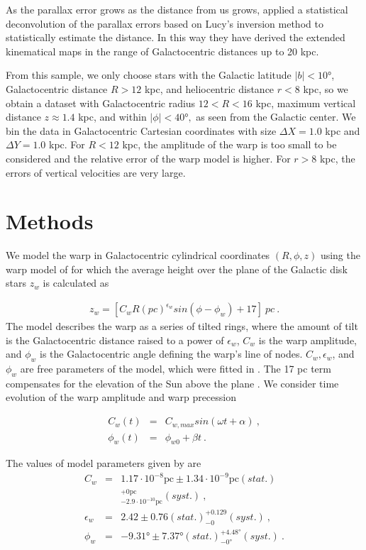 \documentclass[twocolumn]{aastex63}
\begin{document}
As the parallax error grows as the distance from us grows,  applied a statistical deconvolution of the parallax errors based on Lucy's inversion method \citep{lucy} to statistically estimate the distance. In this way they have derived the extended kinematical maps in the range of Galactocentric distances up to 20 kpc.

From this sample, we only choose stars with the Galactic latitude $\lvert b \rvert<\ang{10}$, Galactocentric distance $R>12$ kpc, and heliocentric distance $r<8$ kpc, so we obtain a dataset with Galactocentric radius $12<R<16$ kpc, maximum vertical distance $z\approx1.4$ kpc, and within $\lvert \phi \rvert<\ang{40},$  as seen from the Galactic center. We bin the data in Galactocentric Cartesian coordinates with size $\Delta X=1.0$ kpc and $\Delta Y=1.0$ kpc. For $R<12$ kpc, the amplitude of the warp is too small to be considered and the relative error of the warp model is higher. For $r>8$ kpc, the errors of vertical velocities are very large.

\section{Methods}\label{methods}
We model the warp in Galactocentric cylindrical coordinates $(R,\phi,z)$ using the warp model of \citet[Equation (11)]{zofi} for which the average height over the plane of the Galactic disk stars $z_w$ is calculated as

\begin{eqnarray}\label{9}
z_w=[C_wR(pc)^{\epsilon_w}sin(\phi-\phi_w)+17]~pc~.
\end{eqnarray}
The model describes the warp as a series of tilted rings, where the amount of tilt is the Galactocentric distance raised to a power of $\epsilon_w$, $C_w$ is the warp amplitude, and $\phi_w$ is the Galactocentric angle defining the warp’s line of nodes. $C_w,\epsilon_w$, and $\phi_w$ are free parameters of the model, which were fitted in \cite{zofi}. The 17 pc term compensates for the elevation of the Sun above the plane \citep{z_slnko}. We consider time evolution of the warp amplitude and warp precession

\begin{eqnarray} 
C_w(t)&=&C_{w,max}sin(\omega t+ \alpha)~, \label{param1} \\
\phi_w(t)&=&\phi_{w0}+\beta t~. \label{param2}
\end{eqnarray}

The values of model parameters given by \cite{zofi} are
\begin{eqnarray}\label{parametre}
C_w&=&1.17\cdot10^{-8} \mathrm{pc} \pm 1.34\cdot10^{-9} \mathrm{pc} (stat.) \nonumber \\
&\phantom{}&^{+0 \mathrm{pc}}_{-2.9\cdot10^{-10} \mathrm{pc}}(syst.)~, \nonumber \\
\epsilon_w&=&2.42\pm 0.76(stat.) ^{+0.129}_{-0} (syst.)~, \\
\phi_w&=&\ang{-9.31}\pm \ang{7.37} (stat.) ^{+\ang{4.48}}_{-\ang{0}} (syst.)~. \nonumber
\end{eqnarray}
\end{document}
